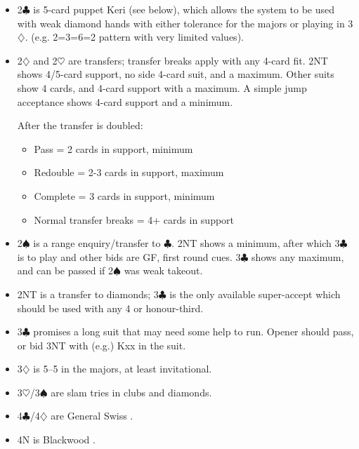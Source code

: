 \documentclass[a4paper,14pt]{extarticle}
\begin{document}
\begin{itemize}

\item 2$\clubsuit$ is 5-card puppet Keri (see below), which allows the system to be used with weak diamond hands with either tolerance for the majors or playing in 3$\diamondsuit$. (e.g. 2=3=6=2 pattern with very limited values).

\item 2$\diamondsuit$ and 2$\heartsuit$ are transfers; transfer breaks apply with any 4-card fit.  2NT
shows 4/5-card support, no side 4-card suit, and a maximum.  Other suits
show 4 cards, and 4-card support with a maximum.  A simple jump acceptance
shows 4-card support and a minimum.

After the transfer is doubled:

	\begin{itemize}
	\item Pass = 2 cards in support, minimum
	\item Redouble = 2-3 cards in support, maximum
	\item Complete = 3 cards in support, minimum
	\item Normal transfer breaks = 4+ cards in support
	\end{itemize}

\item 2$\spadesuit$ is a range enquiry/transfer to $\clubsuit$.  2NT shows a
minimum, after which 3$\clubsuit$ is to play and other bids are GF, first round
cues.  3$\clubsuit$ shows any maximum, and can be passed if 2$\spadesuit$ was
weak takeout.

\item 2NT is a transfer to diamonds; 3$\clubsuit$ is the only available super-accept which 
should be used with any 4 or honour-third.

\item 3$\clubsuit$ promises a long suit that may need some help to run.  Opener should
pass, or bid 3NT with (e.g.) Kxx in the suit.

\item 3$\diamondsuit$ is 5--5 in the majors, at least invitational.

\item 3$\heartsuit$/3$\spadesuit$ are slam tries in clubs and diamonds.

\item 4$\clubsuit$/4$\diamondsuit$ are General Swiss .

\item 4N is Blackwood .

\end{itemize}
\end{document}
